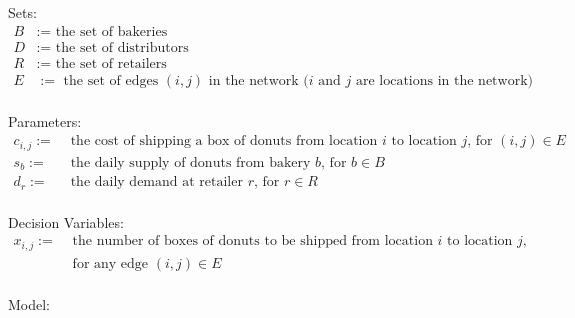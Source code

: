 \documentclass[10pt]{article}
\begin{document}
\bigskip
Sets:
\[
\begin{array}{rl}
B &:= \text{ the set of bakeries}\\
D &:= \text{ the set of distributors}\\
R &:= \text{ the set of retailers}\\
E &:= \text{ the set of edges $(i,j)$ in the network ($i$ and $j$ are locations in the network)}\\
\end{array}
\]

Parameters:
\[
\begin{array}{rl}
c_{i,j} :=& \text{ the cost of shipping a box of donuts from location $i$ to location $j$, for $(i,j) \in E$}\\
s_b :=& \text{ the daily supply of donuts from bakery $b$, for $b \in B$} \\
d_r :=& \text{ the daily demand at retailer $r$, for $r \in R$} \\
\end{array}
\]

Decision Variables:
\[
\begin{array}{rl}
x_{i,j} :=& \text{ the number of boxes of donuts to be shipped from location $i$ to location $j$,} \\
& \text{ for any edge $(i,j) \in E$} \\
\end{array}
\]

Model:
\end{document}

